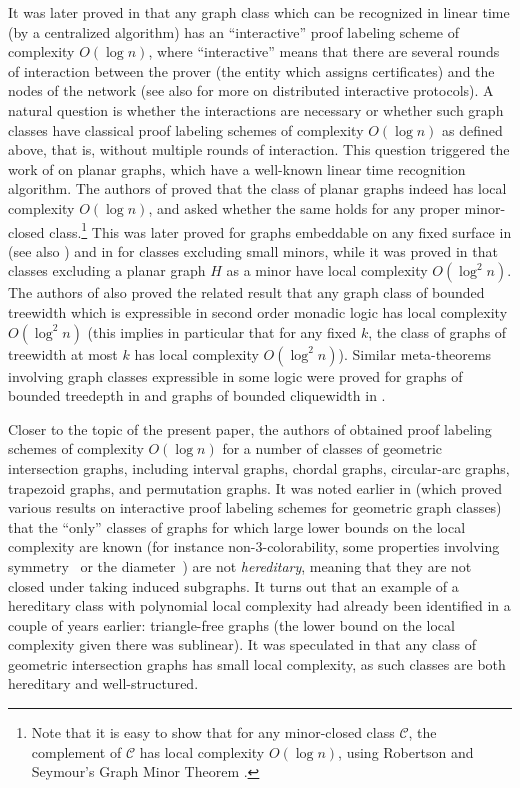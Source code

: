 \documentclass[a4paper,reqno, 12pt]{amsart}
\begin{document}
  It was later proved in \cite{NPY20} that any graph class which can
  be recognized in linear time (by a centralized algorithm) has an ``interactive''
  proof labeling scheme of complexity $O(\log n)$, where
  ``interactive'' means that there are several
  rounds of interaction between the prover
  (the entity which assigns certificates) and the nodes of the network
  (see also \cite{KOS18} for more on distributed interactive protocols). A natural
  question is whether the interactions are necessary or whether such
  graph classes have classical proof labeling schemes of complexity
  $O(\log n)$ as defined above, that is, without multiple rounds of
  interaction.  This question triggered the work of \cite{planar} on planar
  graphs, which have a well-known linear time recognition algorithm. The
  authors of  \cite{planar}  proved that the class of planar graphs indeed has local
  complexity $O(\log n)$, and asked whether the same holds for any
  proper minor-closed class.\footnote{Note that it is easy to show that for any
    minor-closed class $\mathcal{C}$, the complement of $\mathcal{C}$ has local complexity $O(\log n)$, using Robertson and Seymour's Graph Minor Theorem \cite{RS04}.} This
  was later proved for graphs embeddable on any
  fixed surface in \cite{genus} (see also \cite{EL}) and in \cite{BFT} for classes excluding
  small minors, while it was proved in \cite{tw} that classes
  excluding a planar graph $H$ as a minor have local complexity $O(\log^2 n)$. The authors of \cite{tw} also proved the
  related result that any graph class of bounded treewidth which is expressible in second order
  monadic logic has local complexity $O(\log^2 n)$ (this implies in particular that
  for any fixed $k$, the class of graphs of treewidth at most $k$ has
  local complexity $O(\log^2 n)$). Similar meta-theorems involving
  graph classes expressible in some logic were proved
  for graphs of bounded treedepth in \cite{BFT2} and graphs of bounded
  cliquewidth in 
  \cite{fraigniaud2023distributed}.

  Closer to the topic of the present
paper, the authors of \cite{JMR23} obtained proof labeling schemes of
complexity $O(\log n)$ for a number of classes of geometric intersection graphs,
including interval graphs, chordal graphs, circular-arc graphs,
trapezoid graphs, and permutation graphs. It was noted earlier in
\cite{JMR22} (which proved various results on interactive proof
labeling schemes for geometric graph classes) that the ``only'' classes of
graphs for which large lower bounds on the local
complexity are known (for instance
non-3-colorability, some properties involving symmetry~\cite{lcp} or
the diameter~\cite{CPP20}) are
not \emph{hereditary}, meaning that they are not closed under taking
induced subgraphs. 
It turns out that an example of a hereditary class
with polynomial local
complexity had already been identified in \cite{K3F} a couple of years
earlier: triangle-free graphs (the lower bound on the local complexity
given there was sublinear). It was speculated in \cite{JMR22} that
any class of geometric intersection graphs
has
small  local complexity, as such classes are both hereditary and well-structured.  
\end{document}
